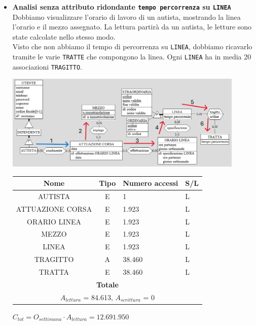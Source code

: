 \documentclass[12pt,a4paper]{report}
\begin{document}
\begin{enumerate}[label=\textbf{\arabic*)}]
\begin{itemize}
            \item \textbf{Analisi senza attributo ridondante \texttt{tempo percorrenza} su \texttt{LINEA}} \\
            Dobbiamo visualizzare l'orario di lavoro di un autista, mostrando la linea l'orario e il mezzo assegnato.
            La lettura partirà da un autista, le letture sono state calcolate nello stesso modo.\\
            Visto che non abbiamo il tempo di percorrenza su \texttt{LINEA}, dobbiamo ricavarlo tramite le varie \texttt{TRATTE} che compongono la linea. Ogni \texttt{LINEA} ha in media 20 associazioni \texttt{TRAGITTO}.
            \begin{center}
	        \includegraphics[width=0.9\textwidth]{op_4_NORID}
	        \end{center}
            \begin{table}[H]
            \centering
            \begin{tabular}{|c|c|l|l|}
            \hline
            \textbf{Nome} & \textbf{Tipo} & \textbf{Numero accessi} & \textbf{S/L} \\
            \hline
            AUTISTA & E & 1 & L \\
            \hline
            ATTUAZIONE CORSA & E & 1.923 & L \\
            \hline
            ORARIO LINEA & E & 1.923 & L \\
            \hline
            MEZZO & E & 1.923 & L \\
            \hline
            LINEA & E & 1.923 & L \\
            \hline
            TRAGITTO & A & 38.460 & L \\
            \hline
            TRATTA & E & 38.460 & L \\
            \hline
            \multicolumn{4}{c}{\textbf{Totale}} \\
            \multicolumn{4}{c}{${A_{lettura}}$ = 84.613, ${A_{scrittura}}$ = 0} \\
            \hline
            \end{tabular}
            \end{table}
            \begin{center}
            ${C_{tot} = {O_{settimana}}\cdot {A_{lettura}} =12.691.950}$
            \end{center}
    \end{itemize}



\end{enumerate}
\end{document}
